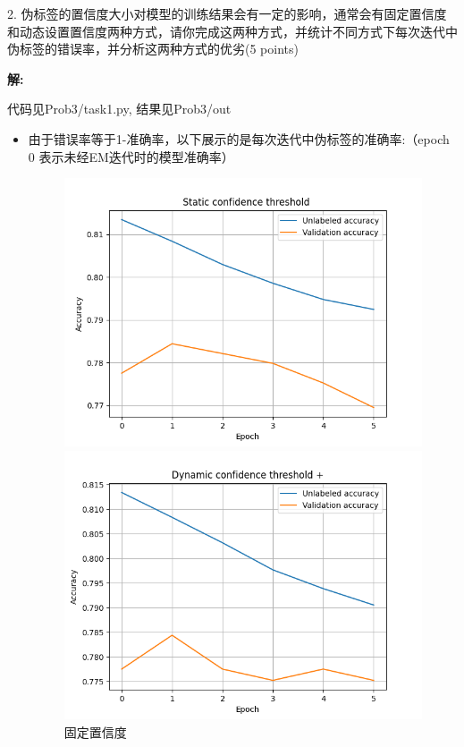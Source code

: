 \documentclass[8pt]{article}
\begin{document}
2. 伪标签的置信度大小对模型的训练结果会有一定的影响，通常会有固定置信度和动态设置置信度两种方式，请你完成这两种方式，并统计不同方式下每次迭代中伪标签的错误率，并分析这两种方式的优劣(5 points)

\textbf{\large 解:}

{\color{red}代码见Prob3/task1.py, 结果见Prob3/out}

\begin{itemize}
    
\item 由于错误率等于1-准确率，以下展示的是每次迭代中伪标签的准确率:（epoch 0 表示未经EM迭代时的模型准确率）

\begin{figure}[H]
    \centering
    \begin{minipage}{0.32\textwidth}
        \includegraphics[width=\textwidth]{Prob3/out/task1_Static confidence threshold .png}
        \caption{固定置信度}
        \label{fig:Fixed Confidence}
    \end{minipage}
    \hfill
    \begin{minipage}{0.32\textwidth}
        \includegraphics[width=\textwidth]{Prob3/out/task1_Dynamic confidence threshold +.png}

\end{minipage}
\end{figure}
\end{itemize}
\end{document}
